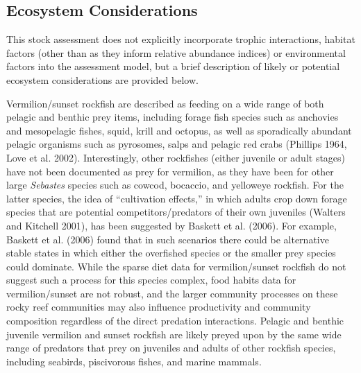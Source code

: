 \documentclass[
  english,
  a4paper,
]{article}
\begin{document}
\hypertarget{ecosystem-considerations-1}{%
\subsection{Ecosystem Considerations}\label{ecosystem-considerations-1}}

This stock assessment does not explicitly incorporate trophic interactions,
habitat factors (other than as they inform relative abundance indices) or environmental
factors into the assessment model, but a brief description of likely or potential
ecosystem considerations are provided below.

Vermilion/sunset rockfish are described as feeding on a wide range of both
pelagic and benthic prey items, including forage fish species such as anchovies
and mesopelagic fishes, squid, krill and octopus, as well as sporadically abundant
pelagic organisms such as pyrosomes, salps and pelagic red crabs
(Phillips 1964, Love et al. 2002). Interestingly, other rockfishes (either juvenile or
adult stages) have not been
documented as prey for vermilion, as they have been for other large \emph{Sebastes}
species such as cowcod, bocaccio, and yelloweye rockfish. For the latter species,
the idea of ``cultivation effects,'' in which adults crop down forage species that
are potential competitors/predators of their own juveniles (Walters and Kitchell 2001),
has been suggested by Baskett et al. (2006). For example, Baskett et al. (2006)
found that in such scenarios there could be alternative stable states in which
either the overfished species or the smaller prey species could dominate. While
the sparse diet data for vermilion/sunset rockfish do not suggest such a process
for this species complex, food habits data for vermilion/sunset are not robust,
and the larger community processes on these rocky reef communities may also influence
productivity and community composition regardless of the direct predation interactions.
Pelagic and benthic juvenile vermilion and sunset rockfish are likely preyed upon by
the same wide range of predators that prey on juveniles and adults of other rockfish
species, including seabirds, piscivorous fishes, and marine mammals.
\end{document}
